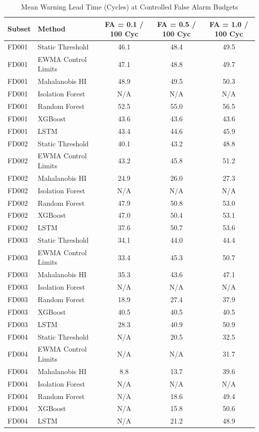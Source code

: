 \begin{table}[t!]
\centering
\small
\caption{Mean Warning Lead Time (Cycles) at Controlled False Alarm Budgets}
\label{tab:lead_time_fa_budgets}
\begin{tabular}{llccc}
\toprule
\textbf{Subset} & \textbf{Method} & \textbf{FA = 0.1 / 100 Cyc} & \textbf{FA = 0.5 / 100 Cyc} & \textbf{FA = 1.0 / 100 Cyc} \\
\midrule
FD001 & Static Threshold & 46.1 & 48.4 & 49.5 \\
FD001 & EWMA Control Limits & 47.1 & 48.8 & 49.7 \\
FD001 & Mahalanobis HI & 48.9 & 49.5 & 50.3 \\
FD001 & Isolation Forest & N/A & N/A & N/A \\
FD001 & Random Forest & 52.5 & 55.0 & 56.5 \\
FD001 & XGBoost & 43.6 & 43.6 & 43.6 \\
FD001 & LSTM & 43.4 & 44.6 & 45.9 \\
\midrule
FD002 & Static Threshold & 40.1 & 43.2 & 48.8 \\
FD002 & EWMA Control Limits & 43.2 & 45.8 & 51.2 \\
FD002 & Mahalanobis HI & 24.9 & 26.0 & 27.3 \\
FD002 & Isolation Forest & N/A & N/A & N/A \\
FD002 & Random Forest & 47.9 & 50.8 & 53.0 \\
FD002 & XGBoost & 47.0 & 50.4 & 53.1 \\
FD002 & LSTM & 37.6 & 50.7 & 53.6 \\
\midrule
FD003 & Static Threshold & 34.1 & 44.0 & 44.4 \\
FD003 & EWMA Control Limits & 33.4 & 45.3 & 50.7 \\
FD003 & Mahalanobis HI & 35.3 & 43.6 & 47.1 \\
FD003 & Isolation Forest & N/A & N/A & N/A \\
FD003 & Random Forest & 18.9 & 27.4 & 37.9 \\
FD003 & XGBoost & 40.5 & 40.5 & 40.5 \\
FD003 & LSTM & 28.3 & 40.9 & 50.9 \\
\midrule
FD004 & Static Threshold & N/A & 20.5 & 32.5 \\
FD004 & EWMA Control Limits & N/A & N/A & 31.7 \\
FD004 & Mahalanobis HI & 8.8 & 13.7 & 39.6 \\
FD004 & Isolation Forest & N/A & N/A & N/A \\
FD004 & Random Forest & N/A & 18.6 & 49.4 \\
FD004 & XGBoost & N/A & 15.8 & 50.6 \\
FD004 & LSTM & N/A & 21.2 & 48.9 \\
\bottomrule
\end{tabular}
\end{table}

